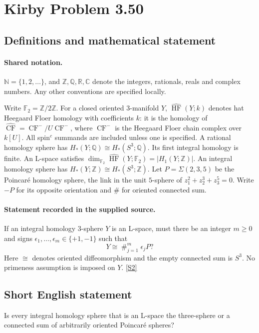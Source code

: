 \documentclass[11pt]{article}
\newcommand{\sref}[2]{\hyperlink{source:#1:#2}{[S#2]}}
\begin{document}
\section{Kirby Problem 3.50}\label{statement}

\subsection{Definitions and mathematical statement}

\paragraph{Shared notation.}$\mathbb N=\{1,2,\ldots\}$, and $\mathbb Z,\mathbb Q,\mathbb R,\mathbb C$ denote the integers, rationals, reals and complex numbers. Any other conventions are specified locally.


Write $\mathbb F_2=\mathbb Z/2\mathbb Z$. For a closed oriented $3$-manifold $Y$, $\widehat{\operatorname{HF}}(Y;k)$ denotes hat Heegaard Floer homology with coefficients $k$: it is the homology of $\widehat{\operatorname{CF}}=\operatorname{CF}^-/U\operatorname{CF}^-$, where $\operatorname{CF}^-$ is the Heegaard Floer chain complex over $k[U]$. All spin$^c$ summands are included unless one is specified. A rational homology sphere has $H_*(Y;\mathbb Q)\cong H_*(S^3;\mathbb Q)$. Its first integral homology is finite. An L-space satisfies $\dim_{\mathbb F_2}\widehat{\operatorname{HF}}(Y;\mathbb F_2)=|H_1(Y;\mathbb Z)|$. An integral homology sphere has $H_*(Y;\mathbb Z)\cong H_*(S^3;\mathbb Z)$. Let $P=\Sigma(2,3,5)$ be the Poincar\'e homology sphere, the link in the unit $5$-sphere of $z_1^2+z_2^3+z_3^5=0$. Write $-P$ for its opposite orientation and $\#$ for oriented connected sum.
\paragraph{Statement recorded in the supplied source.}
If an integral homology $3$-sphere $Y$ is an L-space, must there be an integer $m\ge0$ and signs $\epsilon_1,\ldots,\epsilon_m\in\{+1,-1\}$ such that
\[
Y\cong\mathop{\#}_{j=1}^m\epsilon_jP?
\]
Here $\cong$ denotes oriented diffeomorphism and the empty connected sum is $S^3$. No primeness assumption is imposed on $Y$. \sref{statement}{2}
\subsection{Short English statement}
Is every integral homology sphere that is an L-space the three-sphere or a connected sum of arbitrarily oriented Poincaré spheres?
\end{document}
